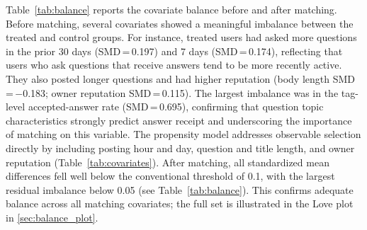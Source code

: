 Table~\ref{tab:balance} reports the covariate balance before and after matching. Before matching, several covariates showed a meaningful imbalance between the treated and control groups. For instance, treated users had asked more questions in the prior 30 days (SMD\,=\,0.197) and 7 days (SMD\,=\,0.174), reflecting that users who ask questions that receive answers tend to be more recently active. They also posted longer questions and had higher reputation (body length SMD\,=\,$-$0.183; owner reputation SMD\,=\,0.115). The largest imbalance was in the tag-level accepted-answer rate (SMD\,=\,0.695), confirming that question topic characteristics strongly predict answer receipt and underscoring the importance of matching on this variable. The propensity model addresses observable selection directly by including posting hour and day, question and title length, and owner reputation (Table~\ref{tab:covariates}). After matching, all standardized mean differences fell well below the conventional threshold of 0.1, with the largest residual imbalance below 0.05 (see Table~\ref{tab:balance}). This confirms adequate balance across all matching covariates; the full set is illustrated in the Love plot in \ref{sec:balance_plot}.

